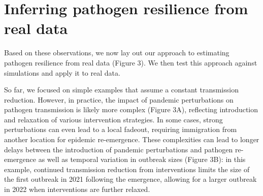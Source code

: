 \documentclass[12pt]{article}
\begin{document}
\section*{Inferring pathogen resilience from real data}

Based on these observations, we now lay out our approach to estimating pathogen resilience from real data (Figure 3).
We then test this approach against simulations and apply it to real data.

So far, we focused on simple examples that assume a constant transmission reduction.
However, in practice, the impact of pandemic perturbations on pathogen transmission is likely more complex (Figure 3A), reflecting introduction and relaxation of various intervention strategies.
In some cases, strong perturbations can even lead to a local fadeout, requiring immigration from another location for epidemic re-emergence.
These complexities can lead to longer delays between the introduction of pandemic perturbations and pathogen re-emergence as well as temporal variation in outbreak sizes (Figure 3B):
in this example, continued transmission reduction from interventions limits the size of the first outbreak in 2021 following the emergence, allowing for a larger outbreak in 2022 when interventions are further relaxed.
\end{document}
